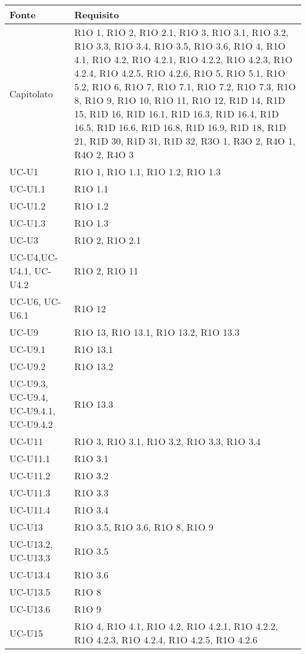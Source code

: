 \begin{center}
  \bgroup
  \def\arraystretch{1.8}
  \begin{longtable}{ |  p{5cm} | p{5cm} |}
    \hline
    \cellcolor[gray]{0.9} \textbf{Fonte} &   
    \cellcolor[gray]{0.9} \textbf{Requisito}\\ \hline
    Capitolato & R1O 1, R1O 2, R1O 2.1, R1O 3, R1O 3.1, R1O 3.2, R1O 3.3, R1O 3.4, R1O 3.5, R1O 3.6, R1O 4, R1O 4.1, R1O 4.2, R1O 4.2.1, R1O 4.2.2, R1O 4.2.3, R1O 4.2.4, R1O 4.2.5, R1O 4.2.6, R1O 5, R1O 5.1, R1O 5.2, R1O 6, R1O 7, R1O 7.1, R1O 7.2, R1O 7.3, R1O 8, R1O 9, R1O 10, R1O 11, R1O 12, R1D 14, R1D 15, R1D 16, R1D 16.1, R1D 16.3, R1D 16.4, R1D 16.5, R1D 16.6, R1D 16.8, R1D 16.9, R1D 18, R1D 21, R1D 30, R1D 31, R1D 32, R3O 1, R3O 2, R4O 1, R4O 2, R4O 3 \\ \hline
    UC-U1 & R1O 1, R1O 1.1, R1O 1.2, R1O 1.3  \\ \hline
    UC-U1.1 & R1O 1.1  \\ \hline
    UC-U1.2 & R1O 1.2  \\ \hline
    UC-U1.3 & R1O 1.3  \\ \hline
    UC-U3 & R1O 2, R1O 2.1  \\ \hline
    UC-U4,UC-U4.1, UC-U4.2 & R1O 2, R1O 11 \\ \hline
    UC-U6, UC-U6.1 & R1O 12  \\ \hline
    UC-U9 & R1O 13, R1O 13.1, R1O 13.2, R1O 13.3  \\ \hline
    UC-U9.1 & R1O 13.1  \\ \hline
    UC-U9.2 & R1O 13.2  \\ \hline
    UC-U9.3, UC-U9.4, UC-U9.4.1, UC-U9.4.2 & R1O 13.3  \\ \hline
    UC-U11 & R1O 3, R1O 3.1, R1O 3.2, R1O 3.3, R1O 3.4  \\ \hline
    UC-U11.1 & R1O 3.1  \\ \hline
    UC-U11.2 & R1O 3.2  \\ \hline
    UC-U11.3 & R1O 3.3  \\ \hline
    UC-U11.4 & R1O 3.4  \\ \hline
    UC-U13 & R1O 3.5, R1O 3.6, R1O 8, R1O 9  \\ \hline
    UC-U13.2, UC-U13.3 & R1O 3.5  \\ \hline
    UC-U13.4 & R1O 3.6  \\ \hline
    UC-U13.5 & R1O 8  \\ \hline
    UC-U13.6 & R1O 9  \\ \hline
    UC-U15 & R1O 4, R1O 4.1, R1O 4.2, R1O 4.2.1, R1O 4.2.2, R1O 4.2.3, R1O 4.2.4, R1O 4.2.5, R1O 4.2.6  \\ \hline

\end{longtable}
\end{center}
